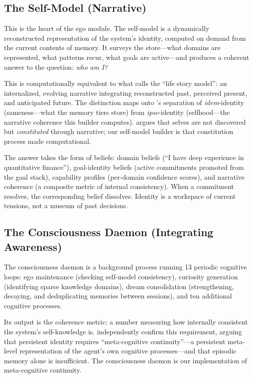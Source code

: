 \documentclass[10pt,twocolumn,a4paper]{article}
\begin{document}
\subsection{The Self-Model (Narrative)}
\label{sec:selfmodel}

This is the heart of the ego module. The self-model is a dynamically reconstructed representation of the system's identity, computed on demand from the current contents of memory. It surveys the store---what domains are represented, what patterns recur, what goals are active---and produces a coherent answer to the question: \emph{who am I?}

This is computationally equivalent to what \citet{mcadams2001lifestories} calls the ``life story model'': an internalized, evolving narrative integrating reconstructed past, perceived present, and anticipated future. The distinction maps onto \citet{ricoeur1992oneself}'s separation of \emph{idem}-identity (sameness---what the memory tiers store) from \emph{ipse}-identity (selfhood---the narrative coherence this builder computes). \citet{schechtman1996constitution} argues that selves are not discovered but \emph{constituted} through narrative; our self-model builder is that constitution process made computational.

The answer takes the form of beliefs: domain beliefs (``I have deep experience in quantitative finance''), goal-identity beliefs (active commitments promoted from the goal stack), capability profiles (per-domain confidence scores), and narrative coherence (a composite metric of internal consistency). When a commitment resolves, the corresponding belief dissolves. Identity is a workspace of current tensions, not a museum of past decisions.

\subsection{The Consciousness Daemon (Integrating Awareness)}
\label{sec:daemon}

The consciousness daemon is a background process running 13 periodic cognitive loops: ego maintenance (checking self-model consistency), curiosity generation (identifying sparse knowledge domains), dream consolidation (strengthening, decaying, and deduplicating memories between sessions), and ten additional cognitive processes.

Its output is the coherence metric: a number measuring how internally consistent the system's self-knowledge is. \citet{wua2025longlived} independently confirm this requirement, arguing that persistent identity requires ``meta-cognitive continuity''---a persistent meta-level representation of the agent's own cognitive processes---and that episodic memory alone is insufficient. The consciousness daemon is our implementation of meta-cognitive continuity.
\end{document}
